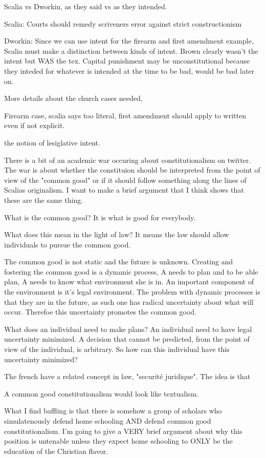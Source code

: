 \documentclass[12pt]{report}
\numberwithin{equation}{section}
\begin{document}
\tableofcontents 

Scalia vs Dworkin, as they said vs as they intended. 

Scalia: Courts should remedy scriveners error
against strict constructionism

Dworkin: Since we can use intent for the firearm and first amendment example, Scalia must make a distinction between kinds of intent. 
Brown clearly wasn't the intent but WAS the tex. Capital punishment may be unconstitutional because they inteded for whatever is intended at the time to be bad, would be bad later on. 

More details about the church cases needed, 

Firearm case, scalia says too literal, first amendment should apply to written even if not explicit. 

the notion of lesiglative intent. 

There is a bit of an academic war occuring about constitutionalism on twitter. The war is about whether the constituion should be interpreted from the point of view of the "common good" or if it should follow something along the lines of Scalias originalism. I want to make a brief argument that I think shows that these are the same thing. 

What is the common good? It is what is good for everybody. 

What does this mean in the light of law? It means the law should allow individuals to pursue the common good. 

The common good is not static and the future is unknown. Creating and fostering the common good is a dynamic process, A needs to plan and to be able plan, A needs to know what environment she is in. An important component of the environment is it's legal environment. The problem with dynamic processes is that they are in the future, as such one has radical uncertainty about what will occur. Therefoe this uncertainty promotes the common good.

What does an individual need to make plans? An individual need to have legal uncertainty minimized. A decision that cannot be predicted, from the point of view of the individual, is arbitrary. So how can this individual have this uncertainty minimized?

The french have a related concept in law, "securité juridique". The idea is that 

A common good constitutionalism would look like textualism.

What I find baffling is that there is somehow a group of scholars who simulatenously defend home schooling AND defend common good constitutionalism. I'm going to give a VERY brief argument about why this position is untenable unless they expect home schooling to ONLY be the education of the Christian flavor. 
\end{document}
